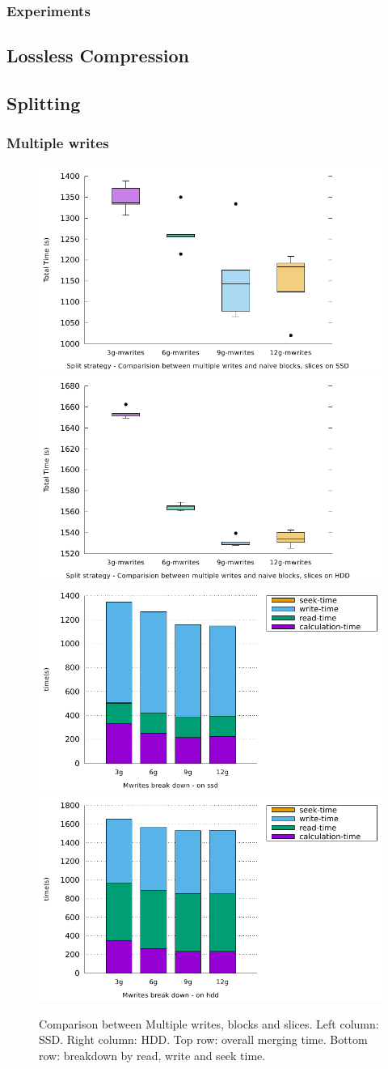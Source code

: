 \documentclass[10pt, conference, compsocconf]{IEEEtran}
\begin{document}
\subsubsection{Experiments}

\subsection{Lossless Compression}

\subsection{Splitting}

\subsubsection{Multiple writes}
\begin{figure}[h]
  \centering
  \includegraphics[width=0.45\columnwidth]{figures/benchmark-mwrites/mwrites-comparision-ssd.pdf}
  \hfill
  \includegraphics[width=0.45\columnwidth]{figures/benchmark-mwrites/mwrites-comparision-hdd.pdf}\\
  \includegraphics[width=0.45\columnwidth]{figures/benchmark-mwrites/mwrites-breakdown-ssd.pdf}
  \hfill
    \includegraphics[width=0.45\columnwidth]{figures/benchmark-mwrites/mwrites-breakdown-hdd.pdf}
  \caption{Comparison between Multiple writes, blocks and slices. Left column: SSD. Right column: HDD. Top row: overall merging time. Bottom row: breakdown by read, write and seek time.}
\label{fig:multiple-writes}
\end{figure}
\end{document}
